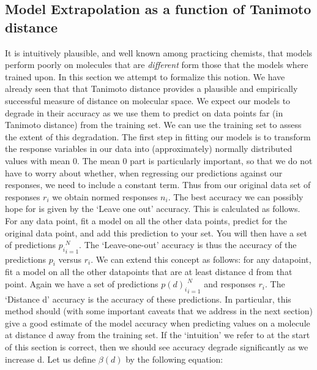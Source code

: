 \documentclass{article}
\begin{document}
\subsection{Model Extrapolation as a function of Tanimoto distance}
It is intuitively plausible, and well known among practicing chemists, that models perform poorly on molecules that are \textit{different} form those that the models where trained upon\cite{et0:}.  In this section we attempt to formalize this notion.  We have already seen that that Tanimoto distance provides a plausible and empirically successful measure of distance on molecular space.
\newline
\newline
We expect our models to degrade in their accuracy as we use them to predict on data points far (in Tanimoto distance) from the training set. We can use the training set to assess the extent of this degradation.
\newline
\newline
The first step in fitting our models is to transform the response variables in our data into (approximately) normally distributed values with mean 0. The mean 0 part is particularly important, so that we do not have to worry about whether, when regressing our predictions against our responses, we need to include a constant term.  Thus from our original data set of responses $r_i$ we obtain normed responses $n_i$.
\newline
\newline
The best accuracy we can possibly hope for is given by the `Leave one out' accuracy.  This is calculated as follows.  For any data point, fit a model on all the other data points, predict for the original data point, and add this prediction to your set.  You will then have a set of predictions ${ p_i }_{i = 1}^N$. The `Leave-one-out' accuracy is thus the accuracy of the predictions $p_i$ versus $r_i$.
\newline
\newline
We can extend this concept as follows:  for any datapoint, fit a model on all the other datapoints that are at least distance d from that point.  Again we have a set of predictions ${ p(d)_i }_{i = 1}^N$ and responses $r_i$.  The `Distance d' accuracy is the accuracy of these predictions.  In particular, this method should (with some important caveats that we address in the next section) give a good estimate of the model accuracy when predicting values on a molecule at distance d away from the training set.  If the `intuition' we refer to at the start of this section is correct, then we should see accuracy degrade significantly as we increase d.
\newline
\newline
Let us define $\beta(d)$ by the following equation:
\end{document}
